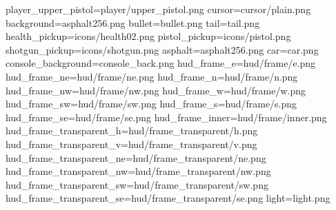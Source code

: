 player_upper_pistol=player/upper_pistol.png
cursor=cursor/plain.png
background=asphalt256.png
bullet=bullet.png
tail=tail.png
health_pickup=icons/health02.png
pistol_pickup=icons/pistol.png
shotgun_pickup=icons/shotgun.png
asphalt=asphalt256.png
car=car.png
console_background=console_back.png
hud_frame_e=hud/frame/e.png
hud_frame_ne=hud/frame/ne.png
hud_frame_n=hud/frame/n.png
hud_frame_nw=hud/frame/nw.png
hud_frame_w=hud/frame/w.png
hud_frame_sw=hud/frame/sw.png
hud_frame_s=hud/frame/s.png
hud_frame_se=hud/frame/se.png
hud_frame_inner=hud/frame/inner.png
hud_frame_transparent_h=hud/frame_transparent/h.png
hud_frame_transparent_v=hud/frame_transparent/v.png
hud_frame_transparent_ne=hud/frame_transparent/ne.png
hud_frame_transparent_nw=hud/frame_transparent/nw.png
hud_frame_transparent_sw=hud/frame_transparent/sw.png
hud_frame_transparent_se=hud/frame_transparent/se.png
light=light.png
